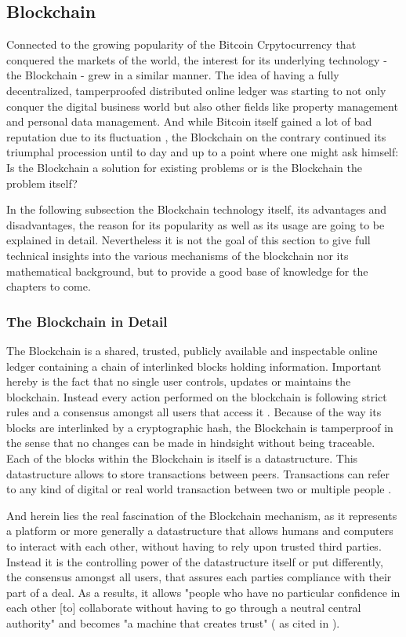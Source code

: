 \subsection{Blockchain}
\label{subsec:02_blockchain}

Connected to the growing popularity of the Bitcoin Crpytocurrency that conquered the markets of the world, the interest for its underlying technology - the Blockchain - grew in a similar manner. The idea of having a fully decentralized, tamperproofed distributed online ledger was starting to not only conquer the digital business world but also other fields like property management and personal data management. And while Bitcoin itself gained a lot of bad reputation due to its fluctuation \cite{Shackelford2016}, the Blockchain on the contrary continued its triumphal procession until to day and up to a point where one might ask himself: Is the Blockchain a solution for existing problems or is the Blockchain the problem itself? \cite{Stinchcombe2017} \cite{Nielsen2018}

In the following subsection the Blockchain technology itself, its advantages and disadvantages, the reason for its popularity as well as its usage are going to be explained in detail. Nevertheless it is not the goal of this section to give full technical insights into the various mechanisms of the blockchain nor its mathematical background, but to provide a good base of knowledge for the chapters to come.

\subsubsection{The Blockchain in Detail}
The Blockchain is a shared, trusted, publicly available and inspectable online ledger containing a chain of interlinked blocks holding information. Important hereby is the fact that no single user controls, updates or maintains the blockchain. Instead every action performed on the blockchain is following strict rules and a consensus amongst all users that access it \cite{Shackelford2016}. Because of the way its blocks are interlinked by a cryptographic hash, the Blockchain is tamperproof in the sense that no changes can be made in hindsight without being traceable. 
Each of the blocks within the Blockchain is itself is a datastructure.  This datastructure allows to store transactions between peers. Transactions can refer to any kind of digital or real world transaction between two or multiple people \cite{Wust2017}.

And herein lies the real fascination of the Blockchain mechanism, as it represents a platform or more generally a datastructure that allows humans and computers to interact with each other, without having to rely upon trusted third parties. Instead it is the controlling power of the datastructure itself or put differently, the consensus amongst all users, that assures each parties compliance with their part of a deal. As a results, it allows "people who have no particular confidence in each other [to] collaborate without having to go through a neutral central authority" and becomes "a machine that creates trust" (\cite{Economist2015} as cited in \cite{Shackelford2016}).
